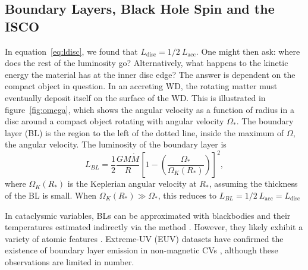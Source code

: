\subsection{Boundary Layers, Black Hole Spin and the ISCO}
\label{sec:bl_isco}
In equation~\ref{eq:ldisc}, we found that $L_{\mathrm{disc}} = 1/2~L_{\mathrm{acc}}$. 
One might then ask: where does the rest of the luminosity go? Alternatively, 
what happens to the kinetic energy the material has at the inner disc edge?
The answer is dependent on the compact object in question. 
In an accreting WD, the rotating matter must eventually deposit itself 
on the surface of the WD. This is illustrated in figure~\ref{fig:omega},
which shows the angular velocity as a function of radius in a disc around
a compact object rotating with angular velocity $\Omega_*$. The boundary layer (BL)
is the region to the left of the dotted line, inside the maximum of $\Omega$, the
angular velocity. The luminosity of the boundary layer is \citep{fkrbook}
\begin{equation}
L_{BL} = \frac{1}{2}\frac{GM \dot{M}}{R} \left[1 - \left(\frac{\Omega_*}{\Omega_K(R_*)}\right)\right]^2,
\end{equation}
where $\Omega_K(R_*)$ is the Keplerian angular velocity at $R_*$, assuming the thickness
of the BL is small. When $\Omega_K(R_*) \gg {\Omega_*}$, this reduces to 
$L_{BL} = 1/2~L_{\mathrm{acc}} = L_{\mathrm{disc}}$

In cataclysmic variables, 
BLs can be approximated with blackbodies and their temperatures estimated
indirectly via the \cite{zanstra1929} method \citep[e.g.][]{hoare1991,hoaredrew1993}.
However, they likely exhibit a variety of atomic features \citep{suleimanov2014}.
Extreme-UV (EUV) datasets have confirmed the existence of boundary layer emission
in non-magnetic CVs \citep{mauche1996}, although these observations
are limited in number.

